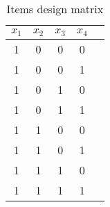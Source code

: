 \begin{table}[htbp]
\caption{\label{tab:X} Items design matrix}\centering\medskip
\begin{tabular}{ccccc} \hline \hline
$x_1$ & $x_2$  & $x_3$  & $x_4$  \\  \hline 
1 & 0 & 0 & 0 \\  
1 & 0 & 0 & 1 \\  
1 & 0 & 1 & 0 \\  
1 & 0 & 1 & 1 \\  
1 & 1 & 0 & 0 \\  
1 & 1 & 0 & 1 \\  
1 & 1 & 1 & 0 \\  
1 & 1 & 1 & 1 \\  
\hline \hline \end{tabular}
\end{table}
